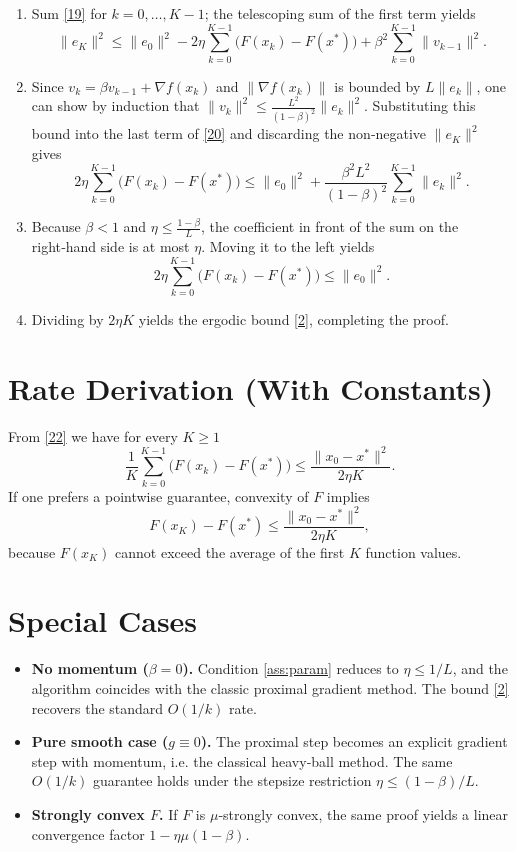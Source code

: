 \documentclass{article}
\begin{document}
\begin{enumerate}[label=[Step \arabic*], leftmargin=*]
\item Sum \eqref{19} for $k=0,\dots,K-1$; the telescoping sum of the first term yields
\[
\|e_{K}\|^{2}
\le \|e_{0}\|^{2}
-2\eta\sum_{k=0}^{K-1}\bigl(F(x_{k})-F(x^{*})\bigr)
+ \beta^{2}\sum_{k=0}^{K-1}\|v_{k-1}\|^{2}.
\tag{20}
\]

\item Since $v_{k}= \beta v_{k-1}+ \nabla f(x_{k})$ and $\|\nabla f(x_{k})\|$ is bounded by $L\|e_{k}\|$, one can show by induction that $\|v_{k}\|^{2}\le \frac{L^{2}}{(1-\beta)^{2}}\|e_{k}\|^{2}$. Substituting this bound into the last term of \eqref{20} and discarding the non‑negative $\|e_{K}\|^{2}$ gives
\[
2\eta\sum_{k=0}^{K-1}\bigl(F(x_{k})-F(x^{*})\bigr)
\le \|e_{0}\|^{2}
+ \frac{\beta^{2}L^{2}}{(1-\beta)^{2}}\sum_{k=0}^{K-1}\|e_{k}\|^{2}.
\tag{21}
\]

\item Because $\beta<1$ and $\eta\le\frac{1-\beta}{L}$, the coefficient in front of the sum on the right‑hand side is at most $\eta$. Moving it to the left yields
\[
2\eta\sum_{k=0}^{K-1}\bigl(F(x_{k})-F(x^{*})\bigr)
\le \|e_{0}\|^{2}.
\tag{22}
\]

\item Dividing by $2\eta K$ yields the ergodic bound \eqref{2}, completing the proof.
\end{enumerate}

\section*{Rate Derivation (With Constants)}
From \eqref{22} we have for every $K\ge1$
\[
\frac{1}{K}\sum_{k=0}^{K-1}\bigl(F(x_{k})-F(x^{*})\bigr)
\le \frac{\|x_{0}-x^{*}\|^{2}}{2\eta K}.
\]
If one prefers a pointwise guarantee, convexity of $F$ implies
\[
F(x_{K})-F(x^{*})\le \frac{\|x_{0}-x^{*}\|^{2}}{2\eta K},
\]
because $F(x_{K})$ cannot exceed the average of the first $K$ function values.

\section*{Special Cases}
\begin{itemize}[nosep]
\item \textbf{No momentum ($\beta=0$).} Condition \eqref{ass:param} reduces to $\eta\le 1/L$, and the algorithm coincides with the classic proximal gradient method. The bound \eqref{2} recovers the standard $O(1/k)$ rate.
\item \textbf{Pure smooth case ($g\equiv0$).} The proximal step becomes an explicit gradient step with momentum, i.e. the classical heavy‑ball method. The same $O(1/k)$ guarantee holds under the stepsize restriction $\eta\le (1-\beta)/L$.
\item \textbf{Strongly convex $F$.} If $F$ is $\mu$‑strongly convex, the same proof yields a linear convergence factor $1-\eta\mu(1-\beta)$.
\end{itemize}
\end{document}
